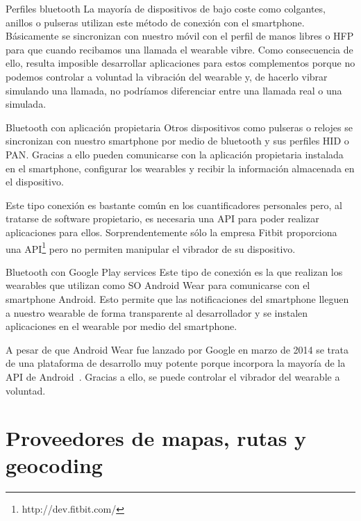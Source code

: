 \begin{definitionlist}
  \item[Perfiles bluetooth] La mayoría de dispositivos de bajo coste como colgantes, anillos o
    pulseras utilizan este método de conexión con el smartphone. Básicamente se sincronizan con
    nuestro móvil con el perfil de manos libres o \acf{HFP} para que cuando recibamos una llamada
    el wearable vibre. Como consecuencia de ello, resulta imposible desarrollar aplicaciones para
    estos complementos porque no podemos controlar a voluntad la vibración del wearable y, de
    hacerlo vibrar simulando una llamada, no podríamos diferenciar entre una llamada real o una
    simulada.

  \item[Bluetooth con aplicación propietaria] Otros dispositivos como pulseras o relojes se
    sincronizan con nuestro smartphone por medio de bluetooth y sus perfiles \acf{HID} o
    \acf{PAN}. Gracias a ello pueden comunicarse con la aplicación propietaria instalada en el
    smartphone, configurar los wearables y recibir la información almacenada en el dispositivo.

    Este tipo conexión es bastante común en los cuantificadores personales pero, al tratarse de
    software propietario, es necesaria una \acs{API} para poder realizar aplicaciones para
    ellos. Sorprendentemente sólo la empresa Fitbit proporciona una
    \acs{API}\footnote{http://dev.fitbit.com/} pero no permiten manipular el vibrador de su
    dispositivo.

  \item[Bluetooth con Google Play services] Este tipo de conexión es la que realizan los wearables
    que utilizan como \acs{SO} Android Wear para comunicarse con el smartphone Android. Esto permite
    que las notificaciones del smartphone lleguen a nuestro wearable de forma transparente al
    desarrollador y se instalen aplicaciones en el wearable por medio del smartphone.

    A pesar de que Android Wear fue lanzado por Google en marzo de 2014 se trata de una plataforma
    de desarrollo muy potente porque incorpora la mayoría de la \acs{API} de
    Android~\cite{APIAW}. Gracias a ello, se puede controlar el vibrador del wearable a voluntad.
 
\end{definitionlist}

\section{Proveedores de mapas, rutas y geocoding}

